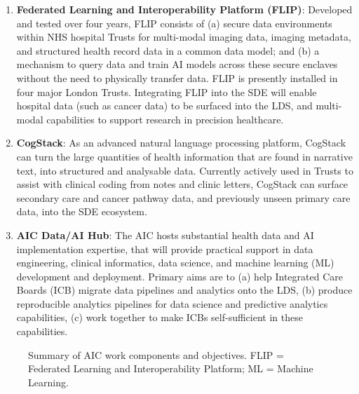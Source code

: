 \documentclass[
  letterpaper,
  DIV=11,
  numbers=noendperiod]{scrartcl}
\begin{document}
\begin{enumerate}
\def\labelenumi{(\arabic{enumi})}
\item
  \textbf{Federated Learning and Interoperability Platform (FLIP)}:
  Developed and tested over four years, FLIP consists of (a) secure data
  environments within NHS hospital Trusts for multi-modal imaging data,
  imaging metadata, and structured health record data in a common data
  model; and (b) a mechanism to query data and train AI models across
  these secure enclaves without the need to physically transfer data.
  FLIP is presently installed in four major London Trusts. Integrating
  FLIP into the SDE will enable hospital data (such as cancer data) to
  be surfaced into the LDS, and multi-modal capabilities to support
  research in precision healthcare.
\item
  \textbf{CogStack}: As an advanced natural language processing
  platform, CogStack can turn the large quantities of health information
  that are found in narrative text, into structured and analysable data.
  Currently actively used in Trusts to assist with clinical coding from
  notes and clinic letters, CogStack can surface secondary care and
  cancer pathway data, and previously unseen primary care data, into the
  SDE ecosystem.
\item
  \textbf{AIC Data/AI Hub}: The AIC hosts substantial health data and AI
  implementation expertise, that will provide practical support in data
  engineering, clinical informatics, data science, and machine learning
  (ML) development and deployment. Primary aims are to (a) help
  Integrated Care Boards (ICB) migrate data pipelines and analytics onto
  the LDS, (b) produce reproducible analytics pipelines for data science
  and predictive analytics capabilities, (c) work together to make ICBs
  self-sufficient in these capabilities.
\end{enumerate}

\begin{figure}


\caption{\label{fig-aic-objectives}Summary of AIC work components and
objectives. FLIP = Federated Learning and Interoperability Platform; ML
= Machine Learning.}

\end{figure}%
\end{document}
